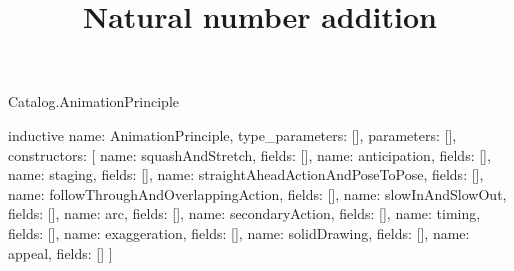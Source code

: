 \begin{lexlean}{Catalog.AnimationPrinciple}
\title{Natural number addition}
\begin{semanticmodule}
inductive{
  name: AnimationPrinciple,
  type_parameters: [],
  parameters: [],
  constructors: [
    {name: squashAndStretch, fields: []},
    {name: anticipation, fields: []},
    {name: staging, fields: []},
    {name: straightAheadActionAndPoseToPose, fields: []},
    {name: followThroughAndOverlappingAction, fields: []},
    {name: slowInAndSlowOut, fields: []},
    {name: arc, fields: []},
    {name: secondaryAction, fields: []},
    {name: timing, fields: []},
    {name: exaggeration, fields: []},
    {name: solidDrawing, fields: []},
    {name: appeal, fields: []}
  ]
}
\end{semanticmodule}
\end{lexlean}
